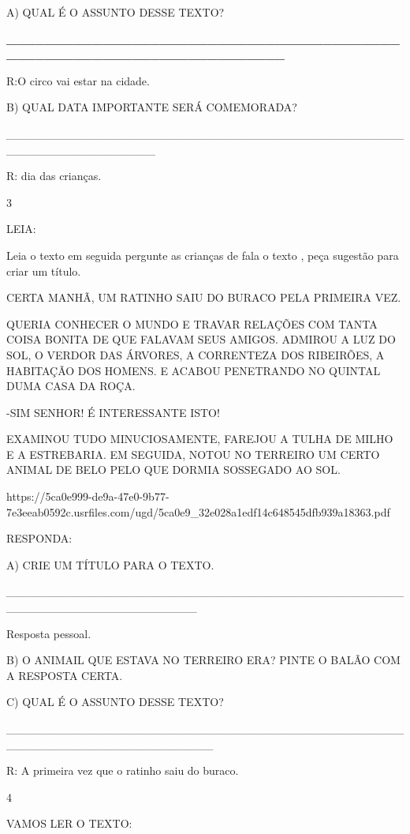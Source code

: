 {{A) QUAL É O ASSUNTO DESSE TEXTO?

\textbf{\_\_\_\_\_\_\_\_\_\_\_\_\_\_\_\_\_\_\_\_\_\_\_\_\_\_\_\_\_\_\_\_\_\_\_\_\_\_\_\_\_\_\_\_\_\_\_\_\_\_\_\_\_\_\_\_\_\_\_\_\_\_\_\_\_\_\_\_\_\_}

R:O circo vai estar na cidade.

B) QUAL DATA IMPORTANTE SERÁ COMEMORADA?

\_\_\_\_\_\_\_\_\_\_\_\_\_\_\_\_\_\_\_\_\_\_\_\_\_\_\_\_\_\_\_\_\_\_\_\_\_\_\_\_\_\_\_\_\_\_\_\_\_\_\_\_\_\_\_\_\_\_\_\_\_\_\_\_\_\_

R: dia das crianças.

\num{3}

LEIA:

Leia o texto em seguida pergunte as crianças de fala o texto , peça
sugestão para criar um título.

CERTA MANHÃ, UM RATINHO SAIU DO BURACO PELA PRIMEIRA VEZ.

QUERIA CONHECER O MUNDO E TRAVAR RELAÇÕES COM TANTA COISA BONITA DE QUE
FALAVAM SEUS AMIGOS. ADMIROU A LUZ DO SOL, O VERDOR DAS ÁRVORES, A
CORRENTEZA DOS RIBEIRÕES, A HABITAÇÃO DOS HOMENS. E ACABOU PENETRANDO NO
QUINTAL DUMA CASA DA ROÇA.

-SIM SENHOR! É INTERESSANTE ISTO!

EXAMINOU TUDO MINUCIOSAMENTE, FAREJOU A TULHA DE MILHO E A ESTREBARIA.
EM SEGUIDA, NOTOU NO TERREIRO UM CERTO ANIMAL DE BELO PELO QUE DORMIA
SOSSEGADO AO SOL.

https://5ca0e999-de9a-47e0-9b77-7e3eeab0592c.usrfiles.com/ugd/5ca0e9\_32e028a1edf14c648545dfb939a18363.pdf

RESPONDA:

A) CRIE UM TÍTULO PARA O TEXTO.

\_\_\_\_\_\_\_\_\_\_\_\_\_\_\_\_\_\_\_\_\_\_\_\_\_\_\_\_\_\_\_\_\_\_\_\_\_\_\_\_\_\_\_\_\_\_\_\_\_\_\_\_\_\_\_\_\_\_\_\_\_\_\_\_\_\_\_\_\_\_\_

Resposta pessoal.

B) O ANIMAIL QUE ESTAVA NO TERREIRO ERA? PINTE O BALÃO COM A RESPOSTA
CERTA.

C) QUAL É O ASSUNTO DESSE TEXTO?

\_\_\_\_\_\_\_\_\_\_\_\_\_\_\_\_\_\_\_\_\_\_\_\_\_\_\_\_\_\_\_\_\_\_\_\_\_\_\_\_\_\_\_\_\_\_\_\_\_\_\_\_\_\_\_\_\_\_\_\_\_\_\_\_\_\_\_\_\_\_\_\_\_

R: A primeira vez que o ratinho saiu do buraco.

\num{4}

VAMOS LER O TEXTO:

}}
